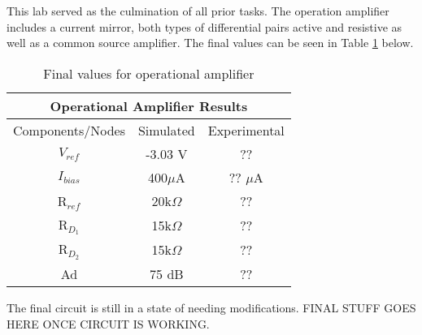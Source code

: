 

This lab served as the culmination of all prior tasks. The operation amplifier includes a current mirror, both types of differential pairs active and resistive as well as a common source amplifier. The final values can be seen in Table \ref{tab:FinalRes} below. 

\begin{table}[H]
\centering
\caption{Final values for operational amplifier}
\label{tab:FinalRes}
\begin{tabular}{|c|c|c|}
\hline
\multicolumn{3}{|c|}{Operational Amplifier Results} \\ \hline
Components/Nodes          & Simulated          & Experimental          \\ \hline
$V_{ref}$               & -3.03 V                   & ??                     \\ \hline
$I_{bias}$                & 400$\mu$A                   & ?? $\mu$A                      \\ \hline
R$_{ref}$                 & 20k$\Omega$               & ??                 \\ \hline
R$_{D_1}$                 & 15k$\Omega$                   & ??                     \\ \hline
R$_{D_2}$                 & 15k$\Omega$                   &  ??                      \\ \hline
Ad                       & 75 dB             & ?? \\ \hline
\end{tabular}
\end{table}

The final circuit is still in a state of needing modifications. FINAL STUFF GOES HERE ONCE CIRCUIT IS WORKING.
